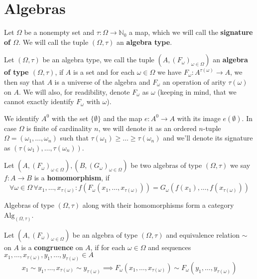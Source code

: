 \section{Algebras}
\begin{definition}
    Let $\Omega$ be a nonempty set and $\tau: \Omega\to\mathbb{N}_0$ a map, which we will call the \textbf{signature of $\Omega$}.
    We will call the tuple $(\Omega,\tau)$ an \textbf{algebra type}.
\end{definition}
\begin{definition}
    Let $(\Omega, \tau)$ be an algebra type, we call the tuple $(A,(F_\omega)_{\omega\in\Omega})$ an \textbf{algebra of type $(\Omega,\tau)$}, if
    $A$ is a set and for each $\omega\in\Omega$ we have $F_\omega : A^{\tau(\omega)}\to A$, we then say that $A$ is a universe of the algebra 
    and $F_{\omega}$ an operation of arity $\tau(\omega)$ on $A$. We will also, for readibility, denote $F_\omega$ as $\omega$ (keeping in mind, that we cannot exactly 
    identify $F_\omega$ with $\omega$).
\end{definition}
\begin{remark}
    We identify $A^0$ with the set $\{\emptyset\}$ and the map $e: A^0 \to A$ with its image $e(\emptyset)$. In case $\Omega$ is finite of cardinality $n$, we will denote 
    it as an ordered $n$-tuple $\Omega=(\omega_1,\dots,\omega_n)$ such that $\tau(\omega_1)\geq\dots\geq\tau(\omega_n)$ and we'll denote its signature as 
    $(\tau(\omega_1),\dots,\tau(\omega_n))$.
\end{remark}
\begin{definition}
    Let $(A,(F_\omega)_{\omega\in\Omega}),(B,(G_\omega)_{\omega\in\Omega})$ be two algebras of type $(\Omega,\tau)$ we say 
    $f:A \to B$ is a \textbf{homomorphism}, if 
    \[
        \forall\omega\in\Omega\,\forall x_1,\dots,x_{\tau(\omega)} : f(F_\omega(x_1,\dots,x_{\tau(\omega)})) = G_\omega(f(x_1),\dots,f(x_{\tau(\omega)})) 
    \]
\end{definition}
\begin{remark}
    Algebras of type $(\Omega,\tau)$ along with their homomorphisms form a category $\mathrm{Alg}_{(\Omega,\tau)}$.
\end{remark}
\begin{definition}
    Let $(A,(F_\omega)_{\omega\in\Omega})$ be an algebra of type $(\Omega,\tau)$ and equivalence relation $\sim$ on $A$ is a \textbf{congruence}
    on $A$, if for each $\omega\in\Omega$ and sequences $x_1,\dots,x_{\tau(\omega)},y_1,\dots,y_{\tau(\omega)}\in A$
    \[
        x_1\sim y_1,\dots, x_{\tau(\omega)}\sim y_{\tau(\omega)} \implies F_\omega(x_1,\dots,x_{\tau(\omega)}) \sim F_\omega(y_1,\dots,y_{\tau(\omega)})
    \]
\end{definition}
